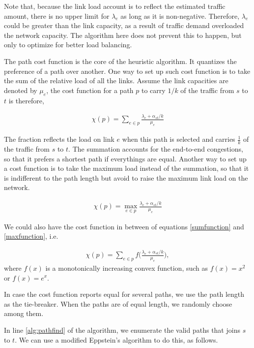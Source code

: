 \documentclass[conference]{IEEEtran}
\begin{document}
Note that, because the link load account is to reflect the estimated traffic
amount, there is no upper limit for $\lambda_e$ as long as it is non-negative.
Therefore, $\lambda_e$ could be greater than the link capacity, as a result of
traffic demand overloaded the network capacity. The algorithm here does not
prevent this to happen, but only to optimize for better load balancing.

The path cost function is the core of the heuristic algorithm. It quantizes the
preference of a path over another. One way to set up such cost function is to
take the sum of the relative load of all the links. Assume the link capacities
are denoted by $\mu_e$, the cost function for a path $p$ to carry $1/k$ of the
traffic from $s$ to $t$ is therefore, 

\begin{align}
\chi(p) = \sum_{e\in p} \frac{\lambda_e + \alpha_{st}/k}{\mu_e}
\label{sumfunction}
\end{align}

The fraction reflects the load on link $e$ when this path is selected and
carries $\frac{1}{k}$ of the traffic from $s$ to $t$. The summation accounts
for the end-to-end congestions, so that it prefers a shortest path if
everythings are equal. Another way to set up a cost function is to take the
maximum load instead of the summation, so that it is indifferent to the path
length but avoid to raise the maximum link load on the network.

\begin{align}
\chi(p) = \max_{e\in p} \frac{\lambda_e + \alpha_{st}/k}{\mu_e}
\label{maxfunction}
\end{align}

We could also have the cost function in between of equations \eqref{sumfunction}
and \eqref{maxfunction}, i.e.

\begin{align}
\chi(p) = \sum_{e\in p} f\big(\frac{\lambda_e + \alpha_{st}/k}{\mu_e}\big),
\label{midfunction}
\end{align}
where $f(x)$ is a monotonically increasing convex function, such as $f(x)=x^2$
or $f(x)=e^x$.

In case the cost function reports equal for several paths, we use the path
length as the tie-breaker. When the paths are of equal length, we randomly
choose among them.

In line \ref{alg:pathfind} of the algorithm, we enumerate the valid paths that
joins $s$ to $t$. We can use a modified Eppstein's algorithm to do this, as
follows.
\end{document}
